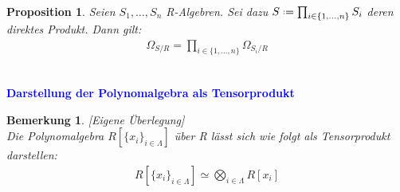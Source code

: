 \documentclass[10pt,a4paper]{report}
\newcounter{Aussage}[chapter]
\newtheorem{prop}[Aussage]{Proposition}
\newtheorem{bem}[Aussage]{Bemerkung}
\newcommand{\divR}[2]{\Omega_{#1/#2}}
\newcommand*{\defeq}{\mathrel{\vcenter{\baselineskip0.5ex \lineskiplimit0pt
                     \hbox{\scriptsize.}\hbox{\scriptsize.}}}%
                     =}
\begin{document}
\ \\
\begin{prop}\label{NNDifferenzial des Produktes von Algebren}
Seien $S_1, \dots , S_n$ R-Algebren. Sei dazu $S \defeq \prod_{i \in \lbrace 1, \dots , n \rbrace} S_i$ deren direktes Produkt.
Dann gilt:
\begin{gather*}
\divR{S}{R} = \prod_{i \in \lbrace 1, \dots , n \rbrace} \divR{S_i}{R}
\end{gather*}
\end{prop}


\ \\
\textcolor{blue}{\textbf{Darstellung der Polynomalgebra als Tensorprodukt}}
\begin{bem}\label{Darstellung der Polynomalgebra als Tensorprodukt}\textit{[Eigene Überlegung]}\\
Die Polynomalgebra $R[\lbrace x_i \rbrace_{i \in \Lambda}]$ über R lässt sich wie folgt als Tensorprodukt darstellen:
\begin{gather*}
R[\lbrace x_i \rbrace_{i \in  \Lambda}] \simeq \bigotimes_{i \in \Lambda} R[x_i]
\end{gather*}
\end{bem}
\end{document}
